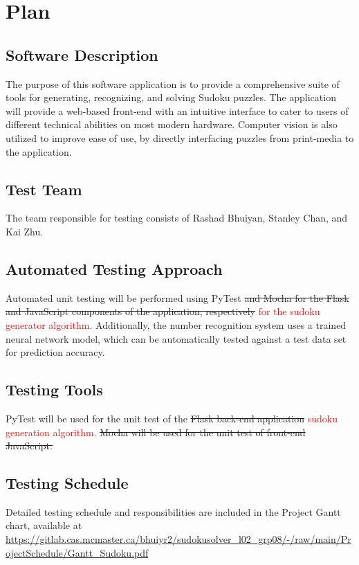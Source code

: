 \documentclass[11pt]{article}
\begin{document}
\newpage

\section{Plan}
	
\subsection{Software Description}
The purpose of this software application is to provide a comprehensive suite of tools for generating, recognizing, and solving Sudoku puzzles. The application will provide a web-based front-end with an intuitive interface to cater to users of different technical abilities on most modern hardware. Computer vision is also utilized to improve ease of use, by directly interfacing puzzles from print-media to the application.

\subsection{Test Team}
The team responsible for testing consists of Rashad Bhuiyan, Stanley Chan, and Kai Zhu.

\subsection{Automated Testing Approach}
Automated unit testing will be performed using PyTest \sout{and Mocha for the Flask and JavaScript components of the application, respectively} \textcolor{red}{for the sudoku generator algorithm}. Additionally, the number recognition system uses a trained neural network model, which can be automatically tested against a test data set for prediction accuracy.

\subsection{Testing Tools}
PyTest will be used for the unit test of the \sout{Flask back-end application} \textcolor{red}{sudoku generation algorithm.} \sout{Mocha will be used for the unit test of front-end JavaScript.}

\subsection{Testing Schedule}
		
Detailed testing schedule and responsibilities are included in the Project Gantt chart, available at  \url{https://gitlab.cas.mcmaster.ca/bhuiyr2/sudokusolver_l02_grp08/-/raw/main/ProjectSchedule/Gantt_Sudoku.pdf}
\end{document}
